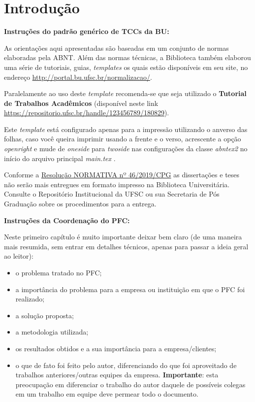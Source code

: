 \chapter{Introdução}

\textbf{Instruções do padrão genérico de TCCs da BU:}

As orientações aqui apresentadas são baseadas em um conjunto de normas elaboradas pela \gls{ABNT}. Além das normas técnicas, a Biblioteca também elaborou uma série de tutoriais, guias, \textit{templates} os quais estão disponíveis em seu site, no endereço \url{http://portal.bu.ufsc.br/normalizacao/}.

Paralelamente ao uso deste \textit{template} recomenda-se que seja utilizado o \textbf{Tutorial de Trabalhos Acadêmicos} (disponível neste link \url{https://repositorio.ufsc.br/handle/123456789/180829}).

Este \textit{template} está configurado apenas para a impressão utilizando o anverso das folhas, caso você queira imprimir usando a frente e o verso, acrescente a opção \textit{openright} e mude de \textit{oneside} para \textit{twoside} nas configurações da classe \textit{abntex2} no início do arquivo principal \textit{main.tex} \cite{abntex2classe}.

Conforme a \href{https://repositorio.ufsc.br/bitstream/handle/123456789/197121/RN46.2019.pdf?sequence=1&isAllowed=y}{Resolução NORMATIVA nº 46/2019/CPG} as dissertações e teses não serão mais entregues em formato impresso na Biblioteca Universitária. Consulte o Repositório Institucional da UFSC ou sua Secretaria de Pós Graduação sobre os procedimentos para a entrega. 

\nocite{NBR6023:2002}
\nocite{NBR6027:2012}
\nocite{NBR6028:2003}
\nocite{NBR10520:2002}

\textbf{Instruções da Coordenação do PFC:}

Neste primeiro capítulo é muito importante deixar bem claro (de uma maneira mais resumida, sem entrar em detalhes técnicos, apenas para passar a ideia geral ao leitor):

\begin{itemize}
    \item o problema tratado no PFC;
    \item a importância do problema para a empresa ou instituição em que o PFC foi realizado;
    \item a solução proposta;
    \item a metodologia utilizada;
    \item os resultados obtidos e a sua importância para a empresa/clientes;
    \item o que de fato foi feito pelo autor, diferenciando do que foi aproveitado de trabalhos anteriores/outras equipes da empresa. \textbf{Importante}: esta preocupação em diferenciar o trabalho do autor daquele de possíveis colegas em um trabalho em equipe deve permear todo o documento.
\end{itemize}

